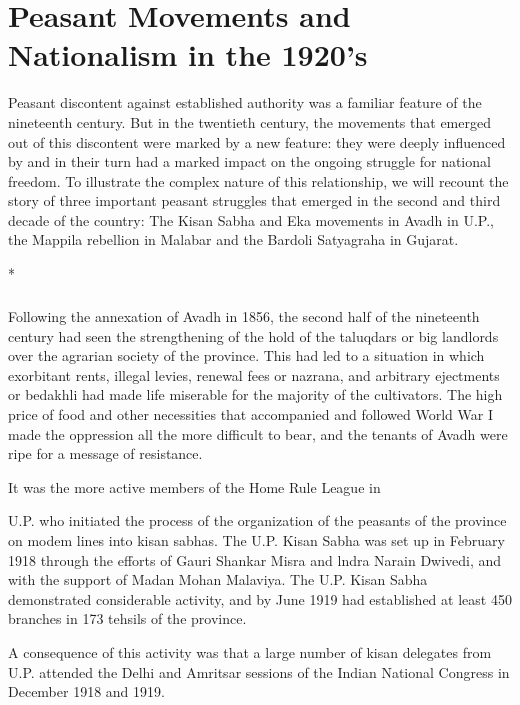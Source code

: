 \chapter{Peasant Movements and Nationalism in the 1920's}
\begin{multicols}{2}

Peasant discontent against established authority was a familiar feature of the nineteenth century. But in the twentieth century, the movements that emerged out of this discontent were marked by a new feature: they were deeply influenced by and in their turn had a marked impact on the ongoing struggle for national freedom. To illustrate the complex nature of this relationship, we will recount the story of three important peasant struggles that emerged in the second and third decade of the country: The Kisan Sabha and Eka movements in Avadh in U.P., the Mappila rebellion in Malabar and the Bardoli Satyagraha in Gujarat.

\begin{center}*\end{center}

\paragraph*{}

Following the annexation of Avadh in 1856, the second half of the nineteenth century had seen the strengthening of the hold of the taluqdars or big landlords over the agrarian society of the province. This had led to a situation in which exorbitant rents, illegal levies, renewal fees or nazrana, and arbitrary ejectments or bedakhli had made life miserable for the majority of the cultivators. The high price of food and other necessities that accompanied and followed World War I made the oppression all the more difficult to bear, and the tenants of Avadh were ripe for a message of resistance.

It was the more active members of the Home Rule League in

U.P. who initiated the process of the organization of the peasants of the province on modem lines into kisan sabhas. The U.P. Kisan Sabha was set up in February 1918 through the efforts of Gauri Shankar Misra and lndra Narain Dwivedi, and with the support of Madan Mohan Malaviya. The U.P. Kisan Sabha demonstrated considerable activity, and by June 1919 had established at least 450 branches in 173 tehsils of the province.

A consequence of this activity was that a large number of kisan delegates from U.P. attended the Delhi and Amritsar sessions of the Indian National Congress in December 1918 and 1919.


\end{multicols}
